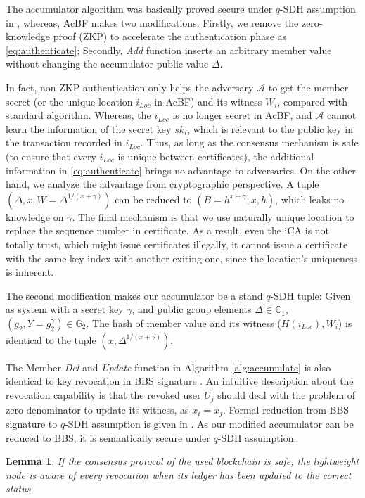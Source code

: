\documentclass[conference]{IEEEtran}
\newtheorem{lemma}{Lemma}[theorem]
\begin{document}
\begin{IEEEproof}
	The accumulator algorithm was basically proved secure under $q$-SDH assumption in \cite{accumulator}, whereas, AcBF makes two modifications. Firstly, we remove the zero-knowledge proof (ZKP) to accelerate the authentication phase as \eqref{eq:authenticate}; Secondly, \textit{Add} function inserts an arbitrary member value without changing the accumulator public value $\Delta$. 
	
	In fact, non-ZKP authentication only helps the adversary $\mathcal{A}$ to get the member secret (or the unique location $i_{Loc}$ in AcBF) and its witness $W_i$, compared with standard algorithm. Whereas, the $i_{Loc}$ is no longer secret in AcBF, and $\mathcal{A}$ cannot learn the information of the secret key $sk_i$, which is relevant to the public key in the transaction recorded in $i_{Loc}$. Thus, as long as the consensus mechanism is safe (to ensure that every $i_{Loc}$ is unique between certificates), the additional information in \eqref{eq:authenticate} brings no advantage to adversaries. On the other hand, we analyze the advantage from cryptographic perspective. A tuple $(\Delta, x, W = \Delta^{1/(x + \gamma)})$ can be reduced to $(B=h^{x+\gamma}, x, h)$, which leaks no knowledge on $\gamma$. The final mechanism is that we use naturally unique location to replace the sequence number in certificate. As a result, even the iCA is not totally trust, which might issue certificates illegally, it cannot issue a certificate with the same key index with another exiting one, since the location's uniqueness is inherent.
	
	The second modification makes our accumulator be a stand $q$-SDH tuple: Given as system with a secret key $\gamma$, and public group elements $\Delta \in \mathbb{G}_1$, $(g_2, Y = g_2^\gamma)\in \mathbb{G}_2$. The hash of member value and its witness ($H(i_{Loc}), W_i$) is identical to the tuple $(x, \Delta^{1/(x+\gamma)})$. 

	The Member \textit{Del} and \textit{Update} function in Algorithm \ref{alg:accumulate} is also identical to key revocation in BBS signature \cite{Boneh2004}. An intuitive description about the revocation capability is that the revoked user $U_j$ should deal with the problem of zero denominator to update its witness, as $x_i=x_j$. Formal reduction from BBS signature to $q$-SDH assumption is given in \cite{Boneh2004}. As our modified accumulator can be reduced to BBS, it is semantically secure under $q$-SDH assumption. 
\end{IEEEproof}
\begin{lemma}
    If the consensus protocol of the used blockchain is safe, the lightweight node is aware of every revocation when its ledger has been updated to the correct status.
\end{lemma}
\end{document}
